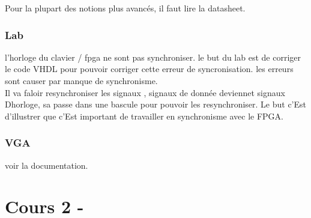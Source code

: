 \documentclass[oneside]{book}
\begin{document}
    Pour la plupart des notions plus avancés, il faut lire la datasheet.\\
    
    \subsection{Lab}
    l'horloge du clavier / fpga ne sont pas synchroniser. le but du lab est de corriger le code VHDL pour pouvoir corriger cette erreur de syncronisation. les erreurs sont causer par manque de synchronisme.\\
    
    Il va faloir resynchroniser les signaux , signaux de donnée deviennet signaux Dhorloge, sa passe dans une bascule pour pouvoir les resynchroniser. Le but c'Est d'illustrer que c'Est important de travailler en synchronisme avec le FPGA.\\
    
    \subsection{VGA}
    voir la documentation.
    
    \chapter{Cours 2 - }
\end{document}
